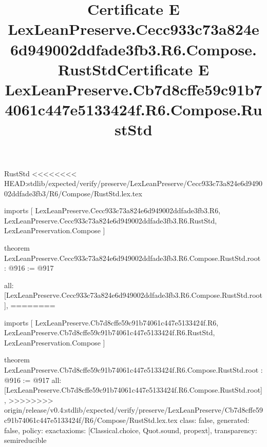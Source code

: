 \begin{lexlean}{RustStd}
<<<<<<<< HEAD:stdlib/expected/verify/preserve/LexLeanPreserve/Cecc933c73a824e6d949002ddfade3fb3/R6/Compose/RustStd.lex.tex
\title{Certificate E LexLeanPreserve.Cecc933c73a824e6d949002ddfade3fb3.R6.Compose.RustStd}
\begin{coremodule}
imports [
  LexLeanPreserve.Cecc933c73a824e6d949002ddfade3fb3.R6,
  LexLeanPreserve.Cecc933c73a824e6d949002ddfade3fb3.R6.RustStd,
  LexLeanPreservation.Compose
]

theorem LexLeanPreserve.Cecc933c73a824e6d949002ddfade3fb3.R6.Compose.RustStd.root : @916 := @917 {
  all: [LexLeanPreserve.Cecc933c73a824e6d949002ddfade3fb3.R6.Compose.RustStd.root],
========
\title{Certificate E LexLeanPreserve.Cb7d8cffe59c91b74061c447e5133424f.R6.Compose.RustStd}
\begin{coremodule}
imports [
  LexLeanPreserve.Cb7d8cffe59c91b74061c447e5133424f.R6,
  LexLeanPreserve.Cb7d8cffe59c91b74061c447e5133424f.R6.RustStd,
  LexLeanPreservation.Compose
]

theorem LexLeanPreserve.Cb7d8cffe59c91b74061c447e5133424f.R6.Compose.RustStd.root : @916 := @917 {
  all: [LexLeanPreserve.Cb7d8cffe59c91b74061c447e5133424f.R6.Compose.RustStd.root],
>>>>>>>> origin/release/v0.4:stdlib/expected/verify/preserve/LexLeanPreserve/Cb7d8cffe59c91b74061c447e5133424f/R6/Compose/RustStd.lex.tex
  class: false,
  generated: false,
  policy: exact{axioms: [Classical.choice, Quot.sound, propext]},
  transparency: semireducible
}


\end{coremodule}}
\end{coremodule}
\end{lexlean}
